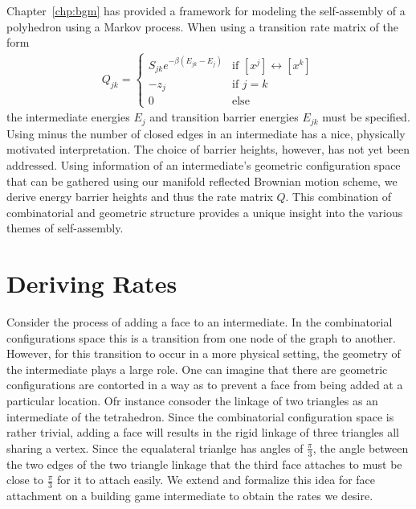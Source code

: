 
Chapter~\ref{chp:bgm} has provided a framework for modeling the self-assembly of a polyhedron using a Markov process. When using a transition rate matrix of the form 
\begin{align}
  \label{eq:Qdef_rep}
  Q_{jk} =
  \begin{cases}
   S_{jk}e^{-\beta\left(E_{jk} - E_{j}\right)} & \text{if } [x^j] \leftrightarrow [x^k]  \\
   -z_j       & \text{if } j = k \\
   0 & \text{else}
  \end{cases}
\end{align}
the intermediate energies $E_j$ and transition barrier energies $E_{jk}$ must be specified. Using minus the number of closed edges in an intermediate has a nice, physically motivated interpretation. The choice of barrier heights, however, has not yet been addressed. Using information of an intermediate's geometric configuration space that can be gathered using our manifold reflected Brownian motion scheme, we derive energy barrier heights and thus the rate matrix $Q$. This combination of combinatorial and geometric structure provides a unique insight into the various themes of self-assembly.

\section{Deriving Rates}

Consider the process of adding a face to an intermediate. In the combinatorial configurations space this is a transition from one node of the graph to another. However, for this transition to occur in a more physical setting, the geometry of the intermediate plays a large role. One can imagine that there are geometric configurations are contorted in a way as to prevent a face from being added at a particular location. Ofr instance consoder the linkage of two triangles as an intermediate of the tetrahedron. Since the combinatorial configuration space is rather trivial, adding a face will results in the rigid linkage of three triangles all sharing a vertex. Since the equalateral trianlge has angles of $\frac{\pi}{3}$, the angle between the two edges of the two triangle linkage that the third face attaches to must be close to $\frac{\pi}{3}$ for it to attach easily. We extend and formalize this idea for face attachment on a building game intermediate to obtain the rates we desire.




